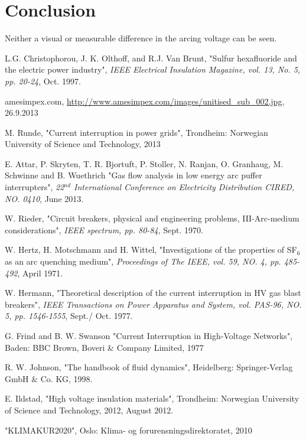 \documentclass[10pt,b5paper,twoside]{article}
\begin{document}
\section{Conclusion}
Neither a visual or measurable difference in the arcing voltage can be seen.

\cleardoublepage
\begin{thebibliography}{10}
 L.G. Christophorou, J. K. Olthoff, and R.J. Van Brunt, "Sulfur hexafluoride and the electric power industry", \textit{IEEE Electrical Insulation Magazine, vol. 13, No. 5, pp. 20-24}, Oct. 1997.

 amesimpex.com, \url{http://www.amesimpex.com/images/unitised_sub_002.jpg}, 26.9.2013

 M. Runde, "Current interruption in power grids", Trondheim: Norwegian University of Science and Technology, 2013

 E. Attar, P. Skryten, T. R. Bjortuft, P. Stoller, N. Ranjan, O. Granhaug, M. Schwinne and B. Wuethrich "Gas flow analysis in low energy arc puffer interrupters", \textit{22$^{nd}$ International Conference on Electricity Distribution CIRED, NO. 0410}, June 2013.

 W. Rieder, "Circuit breakers, physical and engineering problems, III-Arc-medium considerations", \textit{IEEE spectrum, pp. 80-84}, Sept. 1970.

 W. Hertz, H. Motschmann and H. Wittel, "Investigations of the properties of SF$_6$ as an arc quenching medium", \textit{Proceedings of The IEEE, vol. 59, NO. 4, pp. 485-492}, April 1971.

 W. Hermann, "Theoretical description of the current interruption in HV gas blast breakers", \textit{IEEE Transactions on Power Apparatus and System, vol. PAS-96, NO. 5, pp. 1546-1555}, Sept./ Oct. 1977.

 G. Frind and B. W. Swanson "Current Interruption in High-Voltage Networks", Baden: BBC Brown, Boveri \& Company Limited, 1977

 R. W. Johnson, "The handbook of fluid dynamics", Heidelberg: Springer-Verlag GmbH \& Co. KG, 1998.

 E. Ildstad, "High voltage insulation materials", Trondheim: Norwegian University of Science and Technology, 2012, August 2012.

 "KLIMAKUR2020", Oslo: Klima- og forurensningsdirektoratet, 2010


\end{thebibliography}
\end{document}
